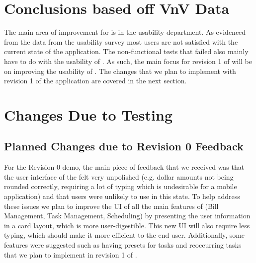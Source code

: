 \documentclass[12pt, titlepage]{article}
\begin{document}
					


	



\section{Conclusions based off VnV Data}

The main area of improvement for \progname{} is in the usability department. As evidenced from the data from the usability survey most users are not satisfied with the current state of the \progname{} application. The non-functional tests that failed also mainly have to do with the usability of \progname{}. As such, the main focus for revision 1 of \progname{} will be on improving the usability of \progname{}. The changes that we plan to implement with revision 1 of the \progname{} application are covered in the next section.


\section{Changes Due to Testing}



\subsection{Planned Changes due to Revision 0 Feedback}

For the Revision 0 demo, the main piece of feedback that we received was that the user interface of the \progname{} felt very unpolished (e.g. dollar amounts not being rounded correctly, requiring a lot of typing which is undesirable for a mobile application) and that users were unlikely to use \progname{} in this state. To help address these issues we plan to improve the UI of all the main features of \progname{} (Bill Management, Task Management, Scheduling) by presenting the user information in a card layout, which is more user-digestible. This new UI will also require less typing, which should make it more efficient to the end user.  Additionally, some features were suggested such as having presets for tasks and reoccurring tasks that we plan to implement in revision 1 of \progname{}.
\end{document}
